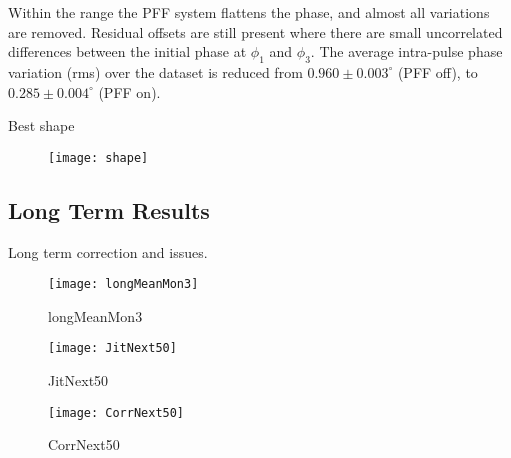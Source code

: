 Within the range the PFF system flattens the phase, and almost all variations 
are removed. 
Residual offsets are still present where there are small uncorrelated 
differences between the initial phase at \(\phi_1\) and \(\phi_3\). 
The average intra-pulse phase variation (rms) over the dataset is reduced from 
\(0.960\pm0.003^\circ\) (PFF off), to \(0.285\pm0.004^\circ\) (PFF on).

Best shape

\begin{figure}
 \centering
  \texttt{[image: shape]}%
  \caption{\label{f:shape}
  }
\end{figure}

\subsection{\label{ss:longResults}Long Term Results}

Long term correction and issues.

\begin{figure}
 \centering
  \texttt{[image: longMeanMon3]}%
  \caption{\label{f:longMeanMon3}longMeanMon3
  }
\end{figure}
\begin{figure}
 \centering
  \texttt{[image: JitNext50]}%
  \caption{\label{f:JitNext50}JitNext50
  }
\end{figure}
\begin{figure}
 \centering
  \texttt{[image: CorrNext50]}%
  \caption{\label{f:CorrNext50}CorrNext50
  }
\end{figure}


